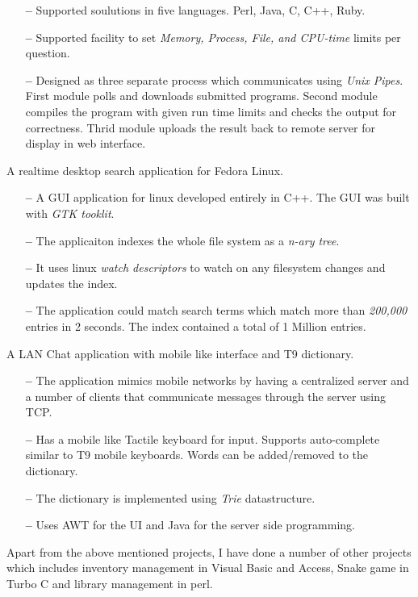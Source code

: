 \documentclass{cv}
\begin{document}
\begin{description}[leftmargin=50pt,labelwidth=50pt]
\begin{itemize}[label={},leftmargin=10pt,topsep=0pt]
      \item[\textbf{--}] Supported soulutions in five languages. Perl, Java, C, C++, Ruby.
      \item[\textbf{--}] Supported facility to set \textit{Memory, Process, File, and CPU-time} limits per question.
      \item[\textbf{--}] Designed as three separate process which communicates using \textit{Unix Pipes}.  First module polls and downloads submitted programs.  Second module compiles the program with given run time limits and checks the output for correctness.  Thrid module uploads the result back to remote server for display in web interface.
    \end{itemize}
  \item[Desktop Search] A realtime desktop search application for Fedora Linux.
    \begin{itemize}[label={},leftmargin=10pt,topsep=0pt]
      \item[\textbf{--}] A GUI application for linux developed entirely in C++.  The GUI was built with \textit{GTK tooklit}.
      \item[\textbf{--}] The applicaiton indexes the whole file system as a \textit{n-ary tree}.
      \item[\textbf{--}] It uses linux \textit{watch descriptors} to watch on any filesystem changes and updates the index.
      \item[\textbf{--}] The application could match search terms which match more than \textit{200,000} entries in 2 seconds.  The index contained a total of 1 Million entries.
    \end{itemize}
  \item[SMS Simulator] A LAN Chat application with mobile like interface and T9 dictionary.
    \begin{itemize}[label={},leftmargin=10pt,topsep=0pt]
      \item[\textbf{--}] The application mimics mobile networks by having a centralized server and a number of clients that communicate messages through the server using TCP\@.
      \item[\textbf{--}] Has a mobile like Tactile keyboard for input.  Supports auto-complete similar to T9 mobile keyboards.  Words can be added/removed to the dictionary.
      \item[\textbf{--}] The dictionary is implemented using \textit{Trie} datastructure.
      \item[\textbf{--}] Uses AWT for the UI and Java for the server side programming.
    \end{itemize}
\end{description}
Apart from the above mentioned projects, I have done a number of other projects which includes inventory management in Visual Basic and Access, Snake game in Turbo C and library management in perl.
\end{document}
